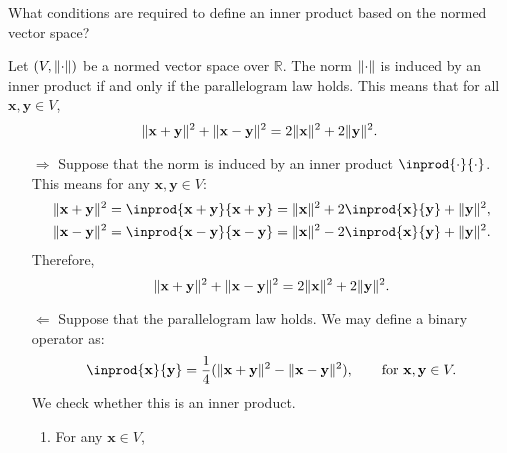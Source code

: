 \documentclass{huhtakm-template-book-v2}
\begin{document}
    What conditions are required to define an inner product based on the normed vector space?
    \begin{thm}
        Let $(V,\lVert{\cdot}\rVert)$ be a normed vector space over $\mathbb{R}$. The norm $\lVert{\cdot}\rVert$ is induced by an inner product if and only if the parallelogram law holds. This means that for all $\mathbf{x}, \mathbf{y} \in V$,
        \begin{equation*}
            \lVert{\mathbf{x}+\mathbf{y}}\rVert^{2} + \lVert{\mathbf{x}-\mathbf{y}}\rVert^{2} = 2\lVert{\mathbf{x}}\rVert^{2} + 2\lVert{\mathbf{y}}\rVert^{2}.
        \end{equation*}
    \end{thm}
    \begin{proofing}
        \begin{itemize}
            \item[$\Longrightarrow$] Suppose that the norm is induced by an inner product $\inprod{\cdot}{\cdot}$. This means for any $\mathbf{x}, \mathbf{y} \in V$:
            \begin{align*}
                \norm{\mathbf{x}+\mathbf{y}}^{2} &= \inprod{\mathbf{x}+\mathbf{y}}{\mathbf{x}+\mathbf{y}} = \norm{\mathbf{x}}^{2} + 2\inprod{\mathbf{x}}{\mathbf{y}} + \norm{\mathbf{y}}^{2},\\
                \norm{\mathbf{x}-\mathbf{y}}^{2} &= \inprod{\mathbf{x}-\mathbf{y}}{\mathbf{x}-\mathbf{y}} = \norm{\mathbf{x}}^{2} - 2\inprod{\mathbf{x}}{\mathbf{y}} + \norm{\mathbf{y}}^{2}.
            \end{align*}
            Therefore,
            \begin{equation*}
                \lVert{\mathbf{x}+\mathbf{y}}\rVert^{2} + \lVert{\mathbf{x}-\mathbf{y}}\rVert^{2} = 2\lVert{\mathbf{x}}\rVert^{2} + 2\lVert{\mathbf{y}}\rVert^{2}.
            \end{equation*}
            \item[$\Longleftarrow$] Suppose that the parallelogram law holds. We may define a binary operator as:
            \begin{equation*}
                \inprod{\mathbf{x}}{\mathbf{y}} = \frac{1}{4}(\norm{\mathbf{x}+\mathbf{y}}^{2} - \norm{\mathbf{x}-\mathbf{y}}^{2}), \qquad \text{for } \mathbf{x}, \mathbf{y} \in V.
            \end{equation*}
            We check whether this is an inner product.
            \begin{enumerate}
                \item For any $\mathbf{x} \in V$,
                \begin{equation*}

\end{equation*}
\end{enumerate}
\end{itemize}
\end{proofing}
\end{document}
